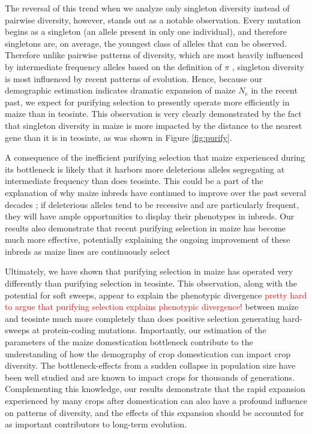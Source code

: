 \documentclass{pnastwo}
\newcommand{\jri}[1]{\textcolor{red}{\scriptsize #1}}
\begin{document}
\begin{article}
The reversal of this trend when we analyze only singleton diversity instead of pairwise diversity, however, stands out as a notable observation. Every mutation begins as a singleton (an allele present in only one individual), and therefore singletons are, on average, the youngest class of alleles that can be observed. Therefore unlike pairwise patterns of diversity, which are most heavily influenced by intermediate frequency alleles based on the definition of $\pi$ \cite{nei1979}, singleton diversity is most influenced by recent patterns of evolution. Hence, because our demographic estimation indicates dramatic expansion of maize $N_e$ in the recent past, we expect for purifying selection to presently operate more efficiently in maize than in teosinte. This observation is very clearly demonstrated by the fact that singleton diversity in maize is more impacted by the distance to the nearest gene than it is in teosinte, as was shown in Figure \ref{fig:purify}.

A consequence of the inefficient purifying selection that maize experienced during its bottleneck is likely that it harbors more deleterious alleles segregating at intermediate frequency than does teosinte. This could be a part of the explanation of why maize inbreds have continued to improve over the past several decades \cite{meghji1984}; if deleterious alleles tend to be recessive and are particularly frequent, they will have ample opportunities to display their phenotypes in inbreds. Our results also demonstrate that recent purifying selection in maize has become much more effective, potentially explaining the ongoing improvement of these inbreds as maize lines are continuously select

Ultimately, we have shown that purifying selection in maize has operated very differently than purifying selection in teosinte. This observation, along with the potential for soft sweeps, appear to explain the phenotypic divergence \jri{pretty hard to argue that purifying selection explains phenotypic divergence!} between maize and teosinte much more completely than does positive selection generating hard-sweeps at protein-coding mutations. Importantly, our estimation of the parameters of the maize domestication bottleneck contribute to the understanding of how the demography of crop domestication can impact crop diversity. The bottleneck-effects from a sudden collapse in population size have been well studied and are known to impact crops for thousands of generations. Complementing this knowledge, our results demonstrate that the rapid expansion experienced by many crops after domestication can also have a profound influence on patterns of diversity, and the effects of this expansion should be accounted for as important contributors to long-term evolution.


\end{article}
\end{document}

